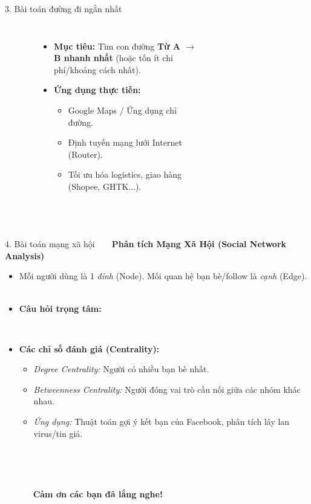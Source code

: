 \documentclass[11pt]{beamer}
\begin{document}
\begin{frame}{3. Bài toán đường đi ngắn nhất}
    \begin{columns}
        \begin{itemize}
        \item \textbf{Mục tiêu:} Tìm con đường \textbf{Từ A $\rightarrow$ B nhanh nhất} (hoặc tốn ít chi phí/khoảng cách nhất). \pause
        \item \textbf{Ứng dụng thực tiễn:}
        \begin{itemize}
        \item Google Maps / Ứng dụng chỉ đường.
        \item Định tuyến mạng lưới Internet (Router).
        \item Tối ưu hóa logistics, giao hàng (Shopee, GHTK...).
        \end{itemize}
        \end{itemize}
        
        \begin{center}
        \end{center}
    \end{columns}
\end{frame}

\begin{frame}{4. Bài toán mạng xã hội}
    \textbf{Phân tích Mạng Xã Hội (Social Network Analysis)}
    \vspace{0.3cm}
    
    \begin{itemize}
        \item Mỗi người dùng là 1 \textit{đỉnh} (Node). Mối quan hệ bạn bè/follow là \textit{cạnh} (Edge). \pause
        \item \textbf{Câu hỏi trọng tâm:} 
        \pause
        \item \textbf{Các chỉ số đánh giá (Centrality):}
        \begin{itemize}
        \item \textit{Degree Centrality:} Người có nhiều bạn bè nhất.
        \item \textit{Betweenness Centrality:} Người đóng vai trò cầu nối giữa các nhóm khác nhau.
        \item \textit{Ứng dụng:} Thuật toán gợi ý kết bạn của Facebook, phân tích lây lan virus/tin giả.
        \end{itemize}
    \end{itemize}
\end{frame}

\begin{frame}
    \begin{center}
        \Huge \textbf{Cảm ơn các bạn đã lắng nghe!}
    \end{center}
\end{frame}
\end{document}
